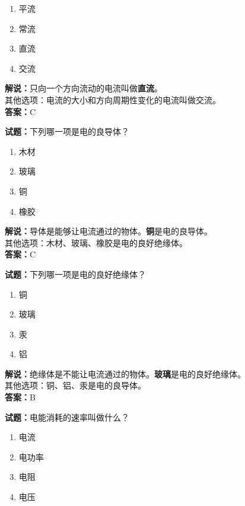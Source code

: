 \documentclass{ctexbook}
\begin{document}
\begin{enumerate}[leftmargin=3em]
	\item 平流
	\item 常流
	\item 直流
	\item 交流
\end{enumerate}

\noindent\textbf{解说：}只向一个方向流动的电流叫做\textbf{直流}。\\
其他选项：电流的大小和方向周期性变化的电流叫做交流。\\
\noindent\textbf{答案：}C

\bigskip


\noindent\textbf{试题：}下列哪一项是电的良导体？

\begin{enumerate}[leftmargin=3em]
	\item 木材
	\item 玻璃
	\item 铜
	\item 橡胶
\end{enumerate}

\noindent\textbf{解说：}导体是能够让电流通过的物体。\textbf{铜}是电的良导体。\cite{Electrical_conductor}\\
其他选项：木材、玻璃、橡胶是电的良好绝缘体。\\
\noindent\textbf{答案：}C


\bigskip


\noindent\textbf{试题：}下列哪一项是电的良好绝缘体？

\begin{enumerate}[leftmargin=3em]
	\item 铜
	\item 玻璃
	\item 汞
	\item 铝
\end{enumerate}

\noindent\textbf{解说：}绝缘体是不能让电流通过的物体。\textbf{玻璃}是电的良好绝缘体。\\
其他选项：铜、铝、汞是电的良导体。\\
\noindent\textbf{答案：}B


\bigskip


\noindent\textbf{试题：}电能消耗的速率叫做什么？

\begin{enumerate}[leftmargin=3em]
	\item 电流
	\item 电功率
	\item 电阻
	\item 电压
\end{enumerate}
\end{document}
